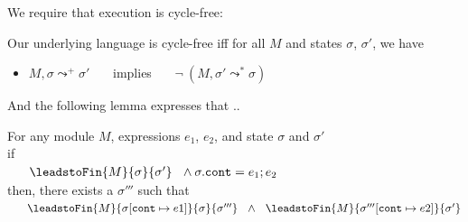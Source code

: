 %

We require that execution is cycle-free:
 \begin{definition}
Our underlying language is cycle-free iff for all $M$ and states $\sigma$, $\sigma'$, we have
\begin{itemize}
\item
$ M, \sigma \leadsto^+ \sigma' $ \ \ \ implies \ \ \  $\neg\ (M, \sigma' \leadsto^* \sigma )$
\end{itemize}
\end{definition}

And the following lemma expresses that ..

\begin{lemma}
\label{lemma:subexp}
For any module $M$, expressions $e_1$, $e_2$, and state $\sigma$ and $\sigma'$
\\
if \\
$\strut \ \ \ \ \ \leadstoFin {M} {\sigma} {\sigma'} \ \ \wedge \sigma.\texttt{cont} = e_1; e_2$
\\
then, there exists a $\sigma'''$ such that\\
%
$\strut \ \ \ \ \ \leadstoFin {M} {\sigma[\texttt{cont}\mapsto e1]} {\sigma} {\sigma'''} \ \ \wedge \ \ %
\leadstoFin {M} {\sigma'''[\texttt{cont}\mapsto e2]}   {\sigma'} $
\end{lemma}
 

